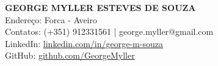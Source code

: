 \documentclass[a4paper,10pt]{article} %
\begin{document}

\begin{center}
    {\fontsize{16}{18}\bfseries\MakeUppercase{George Myller Esteves de Souza}}\\ %
    \vspace{0.5em} %
    Endereço: Forca - Aveiro \\ %
    Contatos: (+351) 912331561 | george.myller@gmail.com \\ %
    LinkedIn: \url{linkedin.com/in/george-m-souza} \\ %
    GitHub: \url{github.com/GeorgeMyller}
\end{center}
\vspace{1em} %

\end{document}
